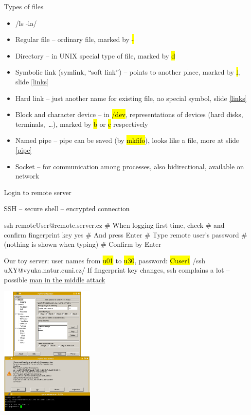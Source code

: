 \documentclass[compress, ucs, xelatex, 11pt, xcolor=svgnames,
  hyperref={
    bookmarks=true,
    unicode=true,
    colorlinks=true,
    pdftitle={Linux, command line and MetaCentrum},
    plainpages=false,
    pdfauthor={Vojtech Zeisek},
    pdfsubject={Course about use of Linux command line, writing shell scripts and using MetaCentrum of CESNET},
    pdfcreator={XeLaTeX},
    pdfkeywords={Linux, GNU, BASH, shell, command line, MetaCentrum},
    linkcolor=Red,
    anchorcolor=Blue,
    citecolor=Purple,
    filecolor=DodgerBlue,
    menucolor=DarkOrchid,
    urlcolor=DeepSkyBlue,
    pdftex},
  url={hyphens, lowtilde} %
  ]{beamer}
\renewcommand{\texttt}[1]{\hl{\ttfamily #1}}
\begin{document}
\begin{frame}{Types of files}
\begin{itemize}
  \item \bash/ls -la/
  \item Regular file -- ordinary file, marked by \texttt{-}
  \item Directory -- in UNIX special type of file, marked by \texttt{d}
  \item Symbolic link (symlink, ``soft link'') -- points to another place, marked by \texttt{l}, slide \ref{links}
  \item Hard link -- just another name for existing file, no special symbol, slide \ref{links}
  \item Block and character device -- in \texttt{/dev}, representations of devices (hard disks, terminals,~\ldots), marked by \texttt{b} or \texttt{c} respectively
  \item Named pipe -- pipe can be saved (by \texttt{mkfifo}), looks like a file, more at slide \ref{pipe}
  \item Socket -- for communication among processes, also bidirectional, available on network
\end{itemize}
\end{frame}

\begin{frame}[fragile]{Login to remote server}
\begin{multicols}{2}
  \vfill
  SSH -- secure shell -- encrypted connection
  \vfill
  \begin{bashcode}
    ssh remoteUser@remote.server.cz
    # When logging first time, check
    # and confirm fingerprint key
    yes # And press Enter
    # Type remote user's password
    # (nothing is shown when typing)
    # Confirm by Enter
  \end{bashcode}
  \vfill
  Our toy server: user names from \texttt{u01} to \texttt{u30}, password: \texttt{Cuser1}
  \vfill
  \bash/ssh uXY@vyuka.natur.cuni.cz/
  \vfill
  If fingerprint key changes, ssh complains a lot -- possible \href{https://en.wikipedia.org/wiki/Man-in-the-middle_attack}{man in the middle attack}
  \vfill
  \begin{center}
    \includegraphics[height=6.5cm]{putty.png}
  \end{center}
\end{multicols}
\end{frame}
\end{document}
